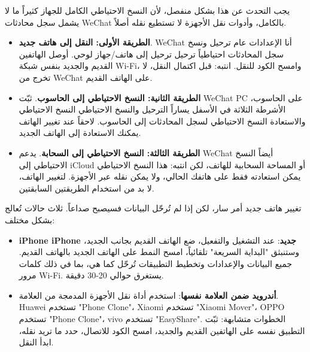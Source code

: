 
يجب التحدث عن هذا بشكل منفصل، لأن النسخ الاحتياطي الكامل للجهاز كثيراً ما لا يشمل سجل محادثات WeChat بالكامل، وأدوات نقل الأجهزة لا تستطيع نقله أصلاً.

\begin{itemize}
  \item \textbf{الطريقة الأولى: النقل إلى هاتف جديد}. WeChat أنا الإعدادات عام ترحيل ونسخ سجل المحادثات احتياطياً ترحيل ترحيل إلى هاتف/جهاز لوحي. أوصل الهاتفين القديم والجديد بنفس شبكة Wi-Fi، وامسح الكود للنقل. انتبه: قبل اكتمال النقل، لا تخرج من WeChat على الهاتف القديم.
  \item \textbf{الطريقة الثانية: النسخ الاحتياطي إلى الحاسوب}. ثبّت WeChat PC على الحاسوب، الأشرطة الثلاثة في الأسفل يساراً الترحيل والنسخ الاحتياطي النسخ الاحتياطي والاستعادة النسخ الاحتياطي لسجل المحادثات إلى الحاسوب. لاحقاً عند تغيير الهاتف يمكنك الاستعادة إلى الهاتف الجديد.
  \item \textbf{الطريقة الثالثة: النسخ الاحتياطي إلى السحابة}. يدعم WeChat أيضاً النسخ الاحتياطي إلى iCloud أو المساحة السحابية للهاتف، لكن انتبه: هذا النسخ الاحتياطي يمكن استعادته فقط على هاتفك الحالي، ولا يمكن نقله عبر الأجهزة. لتغيير الهاتف، لا بد من استخدام الطريقتين السابقتين.
\end{itemize}


تغيير هاتف جديد أمر سار، لكن إذا لم تُرحّل البيانات فسيصبح صداعاً. ثلاث حالات تُعالج بشكل مختلف:


\begin{itemize}
  \item \textbf{iPhone iPhone جديد}: عند التشغيل والتفعيل، ضع الهاتف القديم بجانب الجديد، وستنبثق "البداية السريعة" تلقائياً، امسح النمط على الهاتف الجديد بالهاتف القديم. جميع البيانات والإعدادات وتخطيط التطبيقات تُرحّل كما هي، بما في ذلك كلمات مرور Wi-Fi. يستغرق حوالي 20-30 دقيقة.
  \item \textbf{أندرويد ضمن العلامة نفسها}: استخدم أداة نقل الأجهزة المدمجة من العلامة. Huawei تستخدم "Phone Clone"، Xiaomi تستخدم "Xiaomi Mover"، OPPO تستخدم "Phone Clone"، vivo تستخدم "EasyShare". الخطوات متشابهة: ثبّت التطبيق نفسه على الهاتفين القديم والجديد، امسح الكود للاتصال، حدد ما تريد نقله، ابدأ النقل.
\end{itemize}


